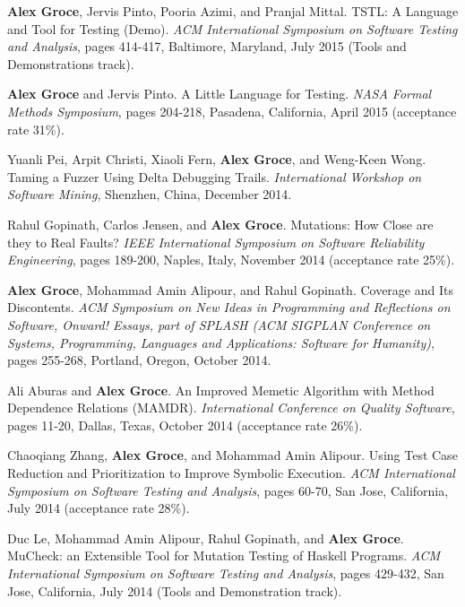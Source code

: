 \documentclass[ComputerScience]{vita}
\begin{document}
\begin{vita}
\begin{Refereed Conference and Workshop Publications}
\item {\bf Alex Groce}, Jervis Pinto, Pooria Azimi, and Pranjal Mittal.
\newblock TSTL: A Language and Tool for Testing (Demo).
\newblock \emph{ACM International Symposium on Software Testing and Analysis}, pages 414-417, Baltimore, Maryland, July 2015 (Tools and Demonstrations track). 

\item {\bf Alex Groce} and Jervis Pinto.
\newblock A Little Language for Testing.
\newblock \emph{NASA Formal Methods Symposium}, pages 204-218, Pasadena, California, April 2015 (acceptance rate 31\%).

\item Yuanli Pei, Arpit Christi, Xiaoli Fern, {\bf Alex Groce}, and Weng-Keen Wong.
\newblock Taming a Fuzzer Using Delta Debugging Trails.
\newblock \emph{International Workshop on Software Mining}, Shenzhen, China, December 2014.

\item Rahul Gopinath, Carlos Jensen, and {\bf Alex Groce}.
\newblock Mutations: How Close are they to Real Faults?
\newblock \emph{IEEE International Symposium on Software Reliability Engineering}, pages 189-200, Naples, Italy, November 2014 (acceptance rate 25\%).

\item
{\bf Alex Groce}, Mohammad Amin Alipour, and Rahul Gopinath.
\newblock Coverage and Its Discontents.
\newblock \emph{ACM Symposium on New Ideas in Programming and Reflections on Software, Onward! Essays, part of SPLASH (ACM SIGPLAN Conference on Systems, Programming, Languages and Applications: Software for Humanity)}, pages 255-268, Portland, Oregon, October 2014.

\item
Ali Aburas and {\bf Alex Groce}.
\newblock An Improved Memetic Algorithm with Method Dependence Relations (MAMDR).
\newblock \emph{International Conference on Quality Software}, pages 11-20, Dallas, Texas, October 2014 (acceptance rate 26\%).

\item
Chaoqiang Zhang, {\bf Alex Groce}, and Mohammad Amin Alipour.
\newblock Using Test Case Reduction and Prioritization to Improve Symbolic Execution.
\newblock \emph{ACM International Symposium on Software Testing and Analysis}, pages 60-70, San Jose, California, July 2014 (acceptance rate 28\%).

\item
Duc Le, Mohammad Amin Alipour, Rahul Gopinath, and {\bf Alex Groce}.
\newblock MuCheck: an Extensible Tool for Mutation Testing of Haskell Programs.
\newblock \emph{ACM International Symposium on Software Testing and Analysis}, pages 429-432, San Jose, California, July 2014 (Tools and Demonstration track). 


\end{Refereed Conference and Workshop Publications}
\end{vita}
\end{document}
